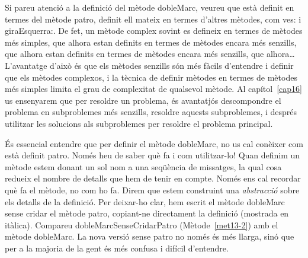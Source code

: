 Si pareu atenció a la definició del mètode \textsf{dobleMarc}, veureu que està definit en termes del mètode \textsf{patro}, definit ell mateix en termes d'altres mètodes, com \textsf{ves:} i \textsf{giraEsquerra:}. De fet, un mètode complex sovint es defineix en termes de mètodes més simples, que alhora estan definits en termes de mètodes encara més senzills, que alhora estan definits en termes de mètodes encara més senzills, que alhora\dots L'avantatge d'això és que els mètodes senzills són més fàcils d'entendre i definir que els mètodes complexos, i la tècnica de definir mètodes en termes de mètodes més simples limita el grau de complexitat de qualsevol mètode. Al capítol~\ref{cap16} us ensenyarem que per resoldre un problema, és avantatjós descompondre el problema en subproblemes més senzills, resoldre aquests subproblemes, i després utilitzar les solucions als subproblemes per resoldre el problema principal.

És essencial entendre que per definir el mètode \textsf{dobleMarc}, no us cal conèixer com està definit \textsf{patro}. Només heu de saber què fa i com utilitzar-lo! Quan definim un mètode estem donant un sol nom a una seqüència de missatges, la qual cosa redueix el nombre de detalls que hem de tenir en compte. Només ens cal recordar què fa el mètode, no com ho fa. Direm que estem construint una \emph{abstracció} sobre els detalls de la definició.
Per deixar-ho clar, hem escrit el mètode \textsf{dobleMarc} sense cridar el mètode \textsf{patro}, copiant-ne directament la definició (mostrada en itàlica). Compareu \textsf{dobleMarcSenseCridarPatro} (Mètode~\ref{met13-2}) amb el mètode \textsf{dobleMarc}. La nova versió sense \textsf{patro} no només és més llarga, sinó que per a la majoria de la gent és més confusa i difícil d'entendre.

